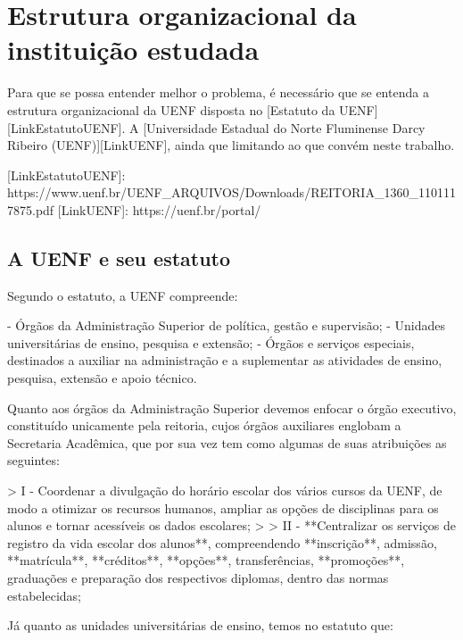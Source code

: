 \chapter{Estrutura organizacional da instituição estudada} %

Para que se possa entender melhor o problema, é necessário que se entenda a estrutura organizacional da UENF disposta no [Estatuto da UENF][LinkEstatutoUENF]. A [Universidade Estadual do Norte Fluminense Darcy Ribeiro (UENF)][LinkUENF], ainda que limitando ao que convém neste trabalho.

[LinkEstatutoUENF]: https://www.uenf.br/UENF_ARQUIVOS/Downloads/REITORIA_1360_1101117875.pdf
[LinkUENF]: https://uenf.br/portal/

\section{A UENF e seu estatuto} %


Segundo o estatuto, a UENF compreende:

- Órgãos da Administração Superior de política, gestão e supervisão;
- Unidades universitárias de ensino, pesquisa e extensão;
- Órgãos e serviços especiais, destinados a auxiliar na administração e a suplementar as atividades de ensino, pesquisa, extensão e apoio técnico.

Quanto aos órgãos da Administração Superior devemos enfocar o órgão executivo, constituído unicamente pela reitoria, cujos órgãos auxiliares englobam a Secretaria Acadêmica, que por sua vez tem como algumas de suas atribuições as seguintes:

> I - Coordenar a divulgação do horário escolar dos vários cursos da UENF, de modo a otimizar os recursos humanos, ampliar as opções de disciplinas para os alunos e tornar acessíveis os dados escolares;
>
> II - **Centralizar os serviços de registro da vida escolar dos alunos**, compreendendo **inscrição**, admissão, **matrícula**, **créditos**, **opções**, transferências, **promoções**, graduações e preparação dos respectivos diplomas, dentro das normas estabelecidas;

Já quanto as unidades universitárias de ensino, temos no estatuto que:

